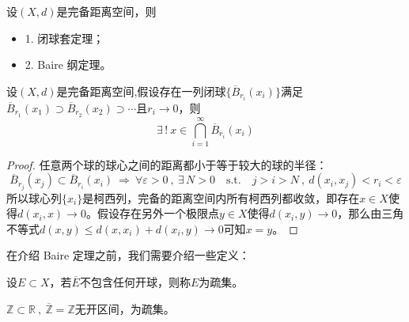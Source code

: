 \begin{theorem}
设$(X,d)$是完备距离空间，则
\begin{itemize}
    \item 1. 闭球套定理；
    \item 2. Baire 纲定理。
\end{itemize}
\end{theorem}
\begin{theorem}[闭球套定理]
设$(X,d)$是完备距离空间,假设存在一列闭球$\{\overline{B}_{r_i}(x_i)\}$满足$\overline{B}_{r_1}(x_1) \supset \overline{B}_{r_2}(x_2) \supset \cdots$且$r_i \to 0$，则
\[\exists \, ! \ x \in \bigcap_{i=1}^{\infty}\overline{B}_{r_i}(x_i)\]
\end{theorem}
\begin{proof}
任意两个球的球心之间的距离都小于等于较大的球的半径：
\[\overline{B}_{r_j}(x_j) \subset \overline{B}_{r_i}(x_i) \ \Rightarrow \ \forall \varepsilon>0 \ , \ \exists \, N>0 \quad \text{s.t.} \quad j>i>N \ , \ d(x_i,x_j)<r_i<\varepsilon\]
所以球心列$\{x_i\}$是柯西列，完备的距离空间内所有柯西列都收敛，即存在$x \in X$使得$d(x_i,x) \to 0$。假设存在另外一个极限点$y \in X$使得$d(x_i,y) \to 0$，那么由三角不等式$d(x,y) \leq d(x,x_i)+d(x_i,y) \rightarrow 0$可知$x=y$。
\end{proof}

在介绍 Baire 定理之前，我们需要介绍一些定义：
\begin{definition}[疏集]\label{definition:sj}
    设$E \subset X$，若$\overline{E}$不包含任何开球，则称$E$为疏集。
\end{definition}
\begin{example}
 \quad $\mathbb{Z} \subset \mathbb{R} \ , \ \overline{\mathbb{Z}}=\mathbb{Z}$无开区间，为疏集。
\end{example}

